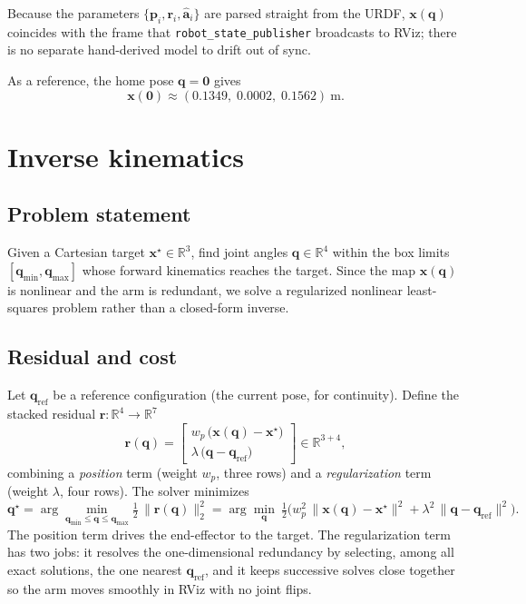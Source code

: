 \documentclass[11pt]{article}
\newcommand{\R}{\mathbb{R}}
\begin{document}
Because the parameters $\{\bm{p}_i,\bm{r}_i,\hat{\bm{a}}_i\}$ are parsed
straight from the URDF, $\bm{x}(\bm{q})$ coincides with the frame that
\texttt{robot\_state\_publisher} broadcasts to RViz; there is no separate
hand-derived model to drift out of sync.

As a reference, the home pose $\bm{q}=\bm{0}$ gives
\[
\bm{x}(\bm{0}) \approx (0.1349,\;0.0002,\;0.1562)\ \si{\meter}.
\]

\section{Inverse kinematics}

\subsection{Problem statement}

Given a Cartesian target $\bm{x}^\star\in\R^3$, find joint angles
$\bm{q}\in\R^4$ within the box limits $[\bm{q}_{\min},\bm{q}_{\max}]$ whose
forward kinematics reaches the target. Since the map $\bm{x}(\bm{q})$ is
nonlinear and the arm is redundant, we solve a regularized nonlinear
least-squares problem rather than a closed-form inverse.

\subsection{Residual and cost}

Let $\bm{q}_{\text{ref}}$ be a reference configuration (the current pose, for
continuity). Define the stacked residual $\bm{r}:\R^4\to\R^{7}$
\begin{equation}
\bm{r}(\bm{q})=
\begin{bmatrix}
w_p\,\big(\bm{x}(\bm{q})-\bm{x}^\star\big)\\[2pt]
\lambda\,\big(\bm{q}-\bm{q}_{\text{ref}}\big)
\end{bmatrix}
\in\R^{3+4},
\end{equation}
combining a \emph{position} term (weight $w_p$, three rows) and a
\emph{regularization} term (weight $\lambda$, four rows). The solver
minimizes
\begin{equation}
\bm{q}^\star=\arg\min_{\bm{q}_{\min}\le\bm{q}\le\bm{q}_{\max}}
   \tfrac{1}{2}\,\lVert \bm{r}(\bm{q})\rVert_2^2
 = \arg\min_{\bm{q}}\ \tfrac{1}{2}\Big(
      w_p^2\,\lVert \bm{x}(\bm{q})-\bm{x}^\star\rVert^2
    + \lambda^2\,\lVert \bm{q}-\bm{q}_{\text{ref}}\rVert^2 \Big).
\end{equation}
The position term drives the end-effector to the target. The regularization
term has two jobs: it resolves the one-dimensional redundancy by selecting,
among all exact solutions, the one nearest $\bm{q}_{\text{ref}}$, and it keeps
successive solves close together so the arm moves smoothly in RViz with no
joint flips.
\end{document}
